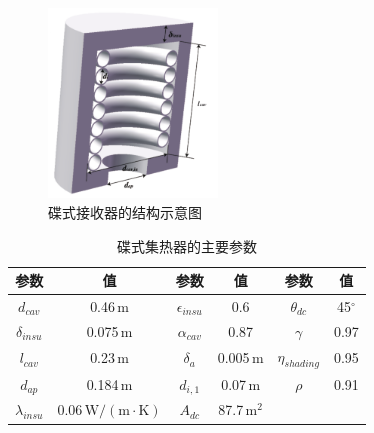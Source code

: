 \begin{figure}[!ht]
\centering
\includegraphics[width=0.4\textwidth]{fig/DishReceiver.pdf}
\caption{碟式接收器的结构示意图}\label{fig:dishReceiver}
\end{figure}

\begin{table}[htbp]
	\setlength{\abovecaptionskip}{-10pt}
	\caption{碟式集热器的主要参数}
	\begin{center}
	\begin{tabular}{cccccc}
		\toprule
		参数		&	值	&	参数		&	值	&	参数		&	值\\
		\midrule
		$d_{cav}$	&	0.46$\,\mathrm{m}$	&	$\epsilon_{insu}$	&	0.6	&	$\theta_{dc}$	&	45$^\circ$\\
		$\delta_{insu}$	&	0.075$\,\mathrm{m}$	&	$\alpha_{cav}$	&	0.87	&	$\gamma$	&	0.97\\
		$l_{cav}$	&	0.23$\,\mathrm{m}$	&	$\delta_a$		&	0.005$\,\mathrm{m}$	&	$\eta_{shading}$	&	0.95\\
		$d_{ap}$	&	0.184$\,\mathrm{m}$	&	$d_{i,1}$	&	0.07$\,\mathrm{m}$	&	$\rho$	&	0.91\\
		$\lambda_{insu}$	&	0.06$\,\mathrm{W/(m\cdot K)}$	&	$A_{dc}$	&	87.7$\,\mathrm{m^2}$	&	\\		
		\bottomrule
	\end{tabular}
	\end{center}
	\label{tab:dc}
\end{table}


